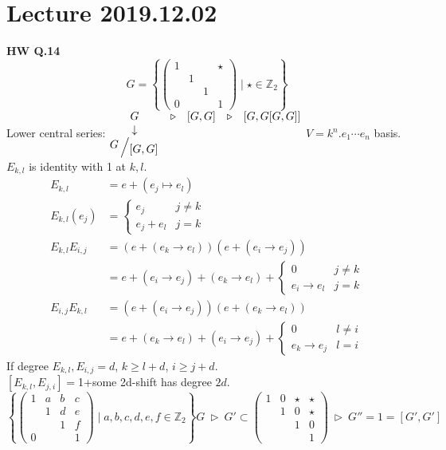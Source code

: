 \documentclass{article}
\let\ddd\cdots
\newcommand{\Z}{\mathbb{Z}}
\newcommand{\quotient}[2]{{\raisebox{.2em}{$#1$}\left/\raisebox{-.2em}{$#2$}\right.}}
\newcommand{\tsupgp}{\triangleright}
\theoremstyle{definition}
\theoremstyle{remark}
\theoremstyle{example}
\begin{document}
	\section*{Lecture 2019.12.02}
	\textbf{HW Q.14}
	\[G=\left\{ \begin{pmatrix}
	1 &&& \star\\
	& 1\\
	&& 1\\
	0&&& 1
	\end{pmatrix} \mid \star \in \Z_2 \right\}\]
	Lower central series: $\begin{matrix}
			G & \tsupgp & [G,G] & \tsupgp& [G,G[G,G]]\\
			\downarrow\\
			\quotient{G}{[G,G]}
	\end{matrix}$
	$V=k^n.e_1 \ddd e_n$ basis.\\
	$E_{k,l}$ is identity with 1 at $k,l$.\\
	\begin{align*}
		E_{k,l}&=e+(e_j \mapsto e_l)\\
		E_{k,l}(e_j)&=\begin{cases}
			e_j & j \neq k\\
			e_j + e_l & j=k
		\end{cases}\\
		E_{k,l}E_{i,j}&=(e+(e_k \to e_l))(e+(e_i \to e_j))\\
		&=e+(e_i\to e_j)+(e_k \to e_l)+\begin{cases}
			0 & j \neq k\\
			e_i \to e_l & j=k
		\end{cases}\\
		E_{i,j}E_{k,l}&=(e+(e_i \to e_j))(e+(e_k \to e_l))\\
		&=e+(e_k\to e_l)+(e_i \to e_j)+\begin{cases}
			0 & l \neq i\\
			e_k \to e_j & l=i
		\end{cases}
	\end{align*}
	If degree $E_{k,l},E_{i,j}=d$, $k \geq l+d$, $i \geq j+d$.\\
	$[E_{k,l},E_{j,i}]=$1+some 2d-shift has degree $2d$.\\
	
	\[ \left\{\begin{pmatrix}
		1 & a & b & c\\
		& 1 & d & e\\
		& & 1 & f\\
		0 & & & 1
	\end{pmatrix} \mid a,b,c,d,e,f \in \Z_2 \right\} G \ \tsupgp \ G' \subset \begin{pmatrix}
		1 & 0 & \star & \star\\
		& 1 & 0 & \star\\
		&& 1 & 0 \\
		&&& 1
	\end{pmatrix} \ \tsupgp\  G''=1=[G',G'] \]
	
\end{document}
